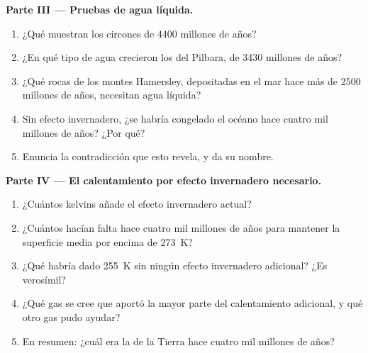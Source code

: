 \begin{problem}
\medskip
\noindent\textbf{Parte III --- Pruebas de agua líquida.}
\begin{enumerate}[resume]
  \item ¿Qué muestran los circones de 4400 millones de años?
  \item ¿En qué tipo de agua crecieron los  del Pilbara, de
        \num{3430} millones de años?
  \item ¿Qué rocas de los montes Hamersley, depositadas en el mar hace más de
        2500 millones de años, necesitan agua líquida?
  \item Sin efecto invernadero, ¿se habría congelado el océano hace cuatro mil
        millones de años? ¿Por qué?
  \item Enuncia la contradicción que esto revela, y da su nombre.
\end{enumerate}

\medskip
\noindent\textbf{Parte IV --- El calentamiento por efecto invernadero necesario.}
\begin{enumerate}[resume]
  \item ¿Cuántos kelvins añade el efecto invernadero actual?
  \item ¿Cuántos hacían falta hace cuatro mil millones de años para mantener
        la superficie media por encima de \qty{273}{K}?
  \item ¿Qué  habría dado \qty{255}{K} sin ningún efecto invernadero
        adicional? ¿Es verosímil?
  \item ¿Qué gas se cree que aportó la mayor parte del calentamiento
        adicional, y qué otro gas pudo ayudar?
  \item En resumen: ¿cuál era la  de la Tierra hace
        cuatro mil millones de años?
\end{enumerate}
\end{problem}
